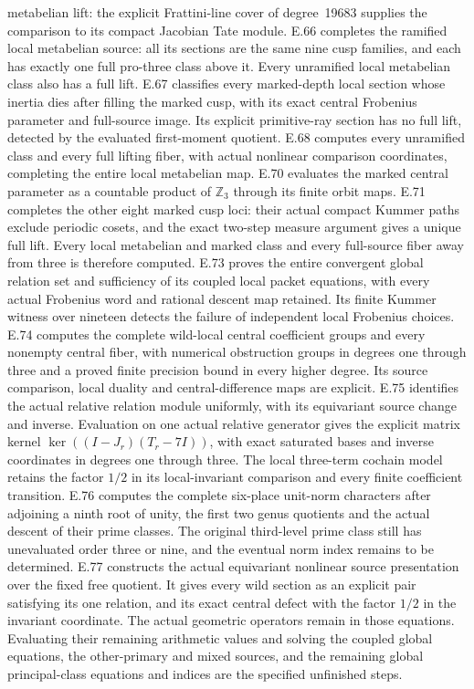 metabelian lift: the explicit Frattini-line cover of
degree~19683 supplies the comparison to its compact
Jacobian Tate module. E.66 completes the ramified local
metabelian source: all its sections are the same nine cusp
families, and each has exactly one full pro-three class
above it. Every unramified local metabelian class also has
a full lift. E.67 classifies every marked-depth local section
whose inertia dies after filling the marked cusp, with its
exact central Frobenius parameter and full-source image. Its
explicit primitive-ray section has no full lift, detected by
the evaluated first-moment quotient. E.68 computes every
unramified class and every full lifting fiber, with actual
nonlinear comparison coordinates, completing the entire
local metabelian map. E.70 evaluates the marked central
parameter as a countable product of $\mathbb Z_3$ through
its finite orbit maps. E.71 completes the other eight marked
cusp loci: their actual compact Kummer paths exclude periodic
cosets, and the exact two-step measure argument gives a unique
full lift. Every local metabelian and marked class and every
full-source fiber away from three is therefore computed.
E.73 proves the entire convergent global relation set and
sufficiency of its coupled local packet equations, with every
actual Frobenius word and rational descent map retained. Its
finite Kummer witness over nineteen detects the failure of
independent local Frobenius choices. E.74 computes the complete wild-local central coefficient
groups and every nonempty central fiber, with numerical
obstruction groups in degrees one through three and a proved
finite precision bound in every higher degree. Its source
comparison, local duality and central-difference maps are explicit.
E.75 identifies the actual relative relation module uniformly, with
its equivariant source change and inverse. Evaluation on one actual
relative generator gives the explicit matrix kernel
$\ker((I-J_r)(T_r-7I))$, with exact saturated bases and
inverse coordinates in degrees one through three. The local
three-term cochain model retains the factor $1/2$ in its
local-invariant comparison and every finite coefficient transition.
E.76 computes the complete six-place unit-norm characters after
adjoining a ninth root of unity, the first two genus quotients and
the actual descent of their prime classes. The original third-level
prime class still has unevaluated order three or nine, and the
eventual norm index remains to be determined.
E.77 constructs the actual equivariant nonlinear source presentation
over the fixed free quotient. It gives every wild section as an
explicit pair satisfying its one relation, and its exact central
defect with the factor $1/2$ in the invariant coordinate. The actual
geometric operators remain in those equations. Evaluating their
remaining arithmetic values and solving the coupled global
equations, the other-primary and mixed sources, and the remaining
global principal-class equations and indices are the specified
unfinished steps.

